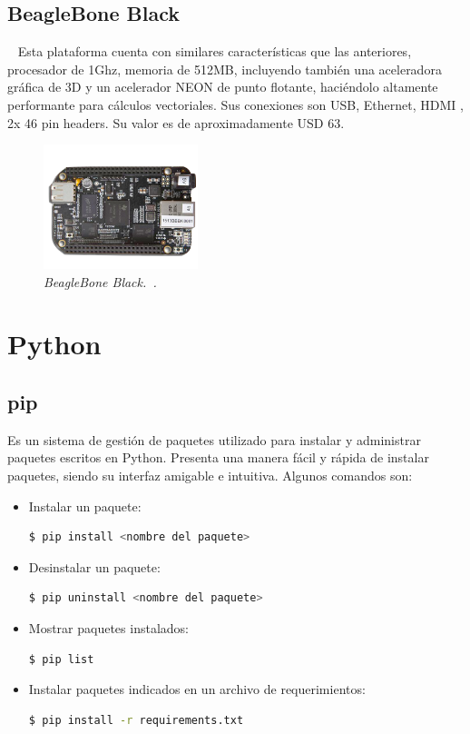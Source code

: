 \subsection{BeagleBone Black} ~
Esta plataforma cuenta con similares características que las anteriores, procesador de 1Ghz, memoria de 512MB, incluyendo también una aceleradora gráfica de 3D y un acelerador NEON de punto flotante, haciéndolo altamente performante para cálculos vectoriales. Sus conexiones son USB, Ethernet, HDMI , 2x 46 pin headers. Su valor es de aproximadamente USD 63.

\begin{figure}[h!]
  \centering
  \includegraphics[width=0.4\textwidth, keepaspectratio]{images/bbb}
  \caption{\textit{BeagleBone Black.~\cite{BeagleB}.}}
  \label{fig:bbb}
\end{figure}

\section{Python}
\subsection{pip}
Es un sistema de gestión de paquetes utilizado para instalar y administrar paquetes escritos en Python. Presenta una manera fácil y rápida de instalar paquetes, siendo su interfaz amigable e intuitiva. Algunos comandos son:

\begin{itemize}
\item Instalar un paquete:
\begin{lstlisting}[language=bash]
  $ pip install <nombre del paquete>
\end{lstlisting}	

\item Desinstalar un paquete:
\begin{lstlisting}[language=bash]
  $ pip uninstall <nombre del paquete>
\end{lstlisting}
	

\item Mostrar paquetes instalados:
\begin{lstlisting}[language=bash]
  $ pip list
\end{lstlisting}
	

\item Instalar paquetes indicados en un archivo de requerimientos:
\begin{lstlisting}[language=bash]
  $ pip install -r requirements.txt
\end{lstlisting}

\end{itemize}

